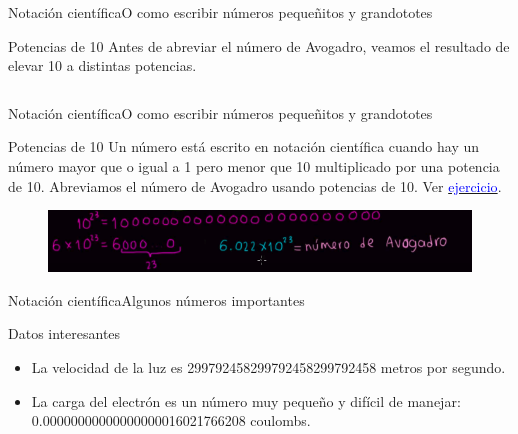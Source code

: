 \documentclass[10pt]{beamer}
\begin{document}
\begin{frame}{Notación científica}{O como escribir números pequeñitos y grandototes}

\begin{block}{Potencias de 10}
Antes de abreviar el número de Avogadro, veamos el resultado de elevar 10 a distintas potencias.
\end{block}
\medskip
\begin{columns}[c]
\column{1.8in}
\column{1.8in}
\end{columns}
\end{frame}

\begin{frame}{Notación científica}{O como escribir números pequeñitos y grandototes}

\begin{block}{Potencias de 10}
Un número está escrito en notación científica cuando hay un número mayor que o igual a 1 pero menor que 10 multiplicado por una potencia de 10.
Abreviamos el número de Avogadro usando potencias de 10. Ver \href{https://es.khanacademy.org/math/pre-algebra/pre-algebra-exponents-radicals/pre-algebra-scientific-notation/e/scientific_notation}{\textcolor{blue}{ejercicio}}.
\end{block}
\medskip
\begin{figure}[h!]
\centering
\includegraphics [scale=0.39]{avogadro}
\label{fig:first}
\end{figure}
\end{frame}

\begin{frame}{Notación científica}{Algunos números importantes}
\begin{block}{Datos interesantes}
\begin{itemize}
    \item La velocidad de la luz es 299792458299792458299792458 metros por segundo.
    \item La carga del electrón es un número muy pequeño y difícil de manejar: 0.00000000000000000016021766208 coulombs.
\end{itemize}
\end{block}

\end{frame}
\end{document}
